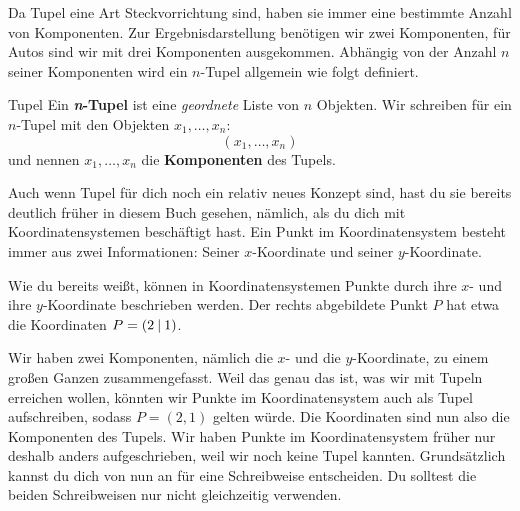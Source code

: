 \documentclass[../../main.tex]{subfiles}
\begin{document}
Da Tupel eine Art Steckvorrichtung sind, haben sie immer eine bestimmte Anzahl von Komponenten. Zur Ergebnisdarstellung benötigen wir zwei Komponenten, für Autos sind wir mit drei Komponenten ausgekommen. Abhängig von der Anzahl $n$ seiner Komponenten wird ein $n$-Tupel allgemein wie folgt definiert.

\begin{definition}{Tupel}
    Ein \textbf{\emph{n}-Tupel} ist eine \textit{geordnete} Liste von $n$ Objekten. Wir schreiben für ein $n$-Tupel mit den Objekten $x_1,\dots,x_n$:
    \[(x_1,\dots,x_n)\]
    und nennen $x_1,\dots,x_n$ die \textbf{Komponenten} des Tupels.
\end{definition}

Auch wenn Tupel für dich noch ein relativ neues Konzept sind, hast du sie bereits deutlich früher in diesem Buch gesehen, nämlich, als du dich mit Koordinatensystemen beschäftigt hast. Ein Punkt im Koordinatensystem besteht immer aus zwei Informationen: Seiner $x$-Koordinate und seiner $y$-Koordinate.

\begin{example}{}
    Wie du bereits weißt, können in Koordinatensystemen Punkte durch ihre $x$- und ihre $y$-Koordinate beschrieben werden. Der rechts abgebildete Punkt $P$ hat etwa die Koordinaten $P=\left(2 \:\middle|\: 1\right)$.

    Wir haben zwei Komponenten, nämlich die $x$- und die $y$-Koordinate, zu einem großen Ganzen zusammengefasst. Weil das genau das ist, was wir mit Tupeln erreichen wollen, könnten wir Punkte im Koordinatensystem auch als Tupel aufschreiben, sodass $P=(2,1)$ gelten würde. Die Koordinaten sind nun also die Komponenten des Tupels. Wir haben Punkte im Koordinatensystem früher nur deshalb anders aufgeschrieben, weil wir noch keine Tupel kannten. Grundsätzlich kannst du dich von nun an für eine Schreibweise entscheiden. Du solltest die beiden Schreibweisen nur nicht gleichzeitig verwenden.

\end{example}
\end{document}
